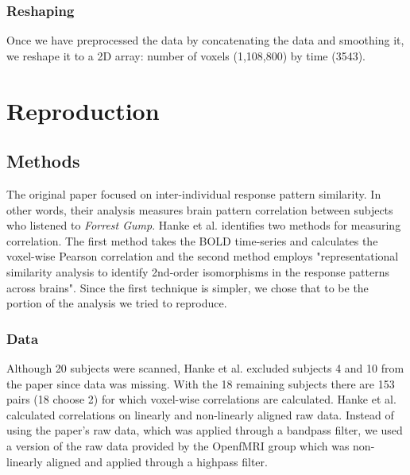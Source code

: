 \documentclass[11pt]{article}
\begin{document}
\subsubsection{Reshaping}
Once we have preprocessed the data by concatenating the data and smoothing it,
we reshape it to a 2D array: number of voxels (1,108,800) by time (3543).

\section{Reproduction}

\subsection{Methods}

The original paper focused on inter-individual response pattern similarity. In
other words, their analysis measures brain pattern correlation between
subjects who listened to \emph{Forrest Gump}. Hanke et al. identifies two 
methods for measuring correlation. The first method takes the BOLD time-series 
and calculates the voxel-wise Pearson correlation and the second method employs
"representational similarity analysis to identify 2nd-order isomorphisms in
the response patterns across brains"\cite{hank2014audiomovie}.  Since the first 
technique is simpler, we chose that to be the portion of the analysis we tried 
to reproduce. 

\subsubsection{Data}
Although 20 subjects were scanned, Hanke et al. excluded subjects 4 and 10 
from the paper since data was missing\cite{hank2014audiomovie}. With the 18 
remaining subjects there are 153 pairs (18 choose 2) for which voxel-wise 
correlations are calculated. Hanke et al. calculated correlations on linearly 
and non-linearly aligned raw data. Instead of using the paper's raw data, which 
was applied through a bandpass filter, we used a version of the raw data 
provided by the OpenfMRI group which was non-linearly aligned and applied 
through a highpass filter.
\end{document}
